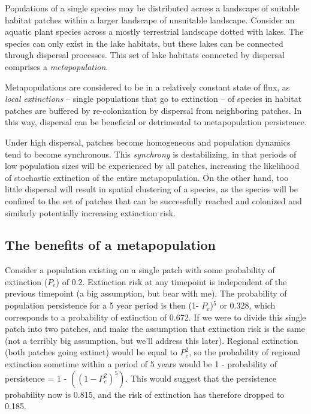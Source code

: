\documentclass[12pt]{article}
\begin{document}
Populations of a single species may be distributed across a landscape of suitable habitat patches within a larger landscape of unsuitable landscape. Consider an aquatic plant species across a mostly terrestrial landscape dotted with lakes. The species can only exist in the lake habitats, but these lakes can be connected through dispersal processes. This set of lake habitats connected by dispersal comprises a \textit{metapopulation}. 

Metapopulations are considered to be in a relatively constant state of flux, as \textit{local extinctions} -- single populations that go to extinction -- of species in habitat patches are buffered by re-colonization by dispersal from neighboring patches. In this way, dispersal can be beneficial or detrimental to metapopulation persistence. 


Under high dispersal, patches become homogeneous and population dynamics tend to become synchronous. This \textit{synchrony} is destabilizing, in that periods of low population sizes will be experienced by all patches, increasing the likelihood of stochastic extinction of the entire metapopulation. On the other hand, too little dispersal will result in spatial clustering of a species, as the species will be confined to the set of patches that can be successfully reached and colonized and similarly potentially increasing extinction risk.









\bigskip

\subsection*{The benefits of a metapopulation}

Consider a population existing on a single patch with some probability of extinction ($P_e$) of 0.2. Extinction risk at any timepoint is independent of the previous timepoint (a big assumption, but bear with me). The probability of population persistence for a 5 year period is then (1- $P_e$)$^{5}$ or 0.328, which corresponds to a probability of extinction of 0.672. If we were to divide this single patch into two patches, and make the assumption that extinction risk is the same (not a terribly big assumption, but we'll address this later). Regional extinction (both patches going extinct) would be equal to $P_{e}^{2}$, so the probability of regional extinction sometime within a period of 5 years would be  1 - probability of persistence = 1 - $\left((1 - P_e^{2})^{5}\right)$. This would suggest that the persistence probability now is 0.815, and the risk of extinction has therefore dropped to 0.185. 
\end{document}
